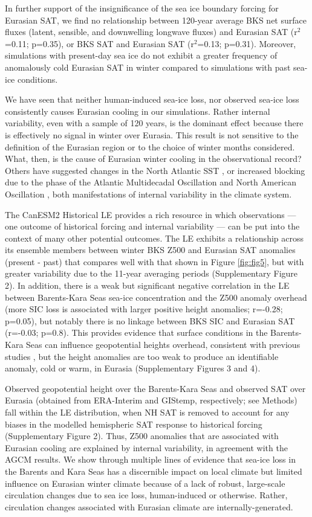 \documentclass{nature}
\begin{document}
In further support of the insignificance of the sea ice boundary forcing for Eurasian SAT, we find no relationship between 120-year average BKS net surface fluxes (latent, sensible, and downwelling longwave fluxes) and Eurasian SAT (r$^2$=0.11; p=0.35), or BKS SAT and Eurasian SAT (r$^2$=0.13; p=0.31). Moreover, simulations with present-day sea ice do not exhibit a greater frequency of anomalously cold Eurasian SAT in winter compared to simulations with past sea-ice conditions.

We have seen that neither human-induced sea-ice loss, nor observed sea-ice loss consistently causes Eurasian cooling in our simulations. Rather internal variability, even with a sample of 120 years, is the dominant effect because there is effectively no signal in winter over Eurasia. This result is not sensitive to the definition of the Eurasian region or to the choice of winter months considered. What, then, is the cause of Eurasian winter cooling in the observational record? Others have suggested changes in the North Atlantic SST \cite{sato14}, or increased blocking due to the phase of the Atlantic Multidecadal Oscillation and North American Oscillation \cite{peings14b}, both manifestations of internal variability in the climate system. 

The CanESM2 Historical LE provides a rich resource in which observations --- one outcome of historical forcing and internal variability --- can be put into the context of many other potential outcomes. The LE exhibits a relationship across its ensemble members between winter BKS Z500 and Eurasian SAT anomalies (present - past) that compares well with that shown in Figure \ref{fig:fig5}, but with greater variability due to the 11-year averaging periods (Supplementary Figure 2). In addition, there is a weak but significant negative correlation in the LE between Barents-Kara Seas sea-ice concentration and the Z500 anomaly overhead (more SIC loss is associated with larger positive height anomalies; r=-0.28; p=0.05), but notably there is no linkage between BKS SIC and Eurasian SAT (r=-0.03; p=0.8). This provides evidence that surface conditions in the Barents-Kara Seas can influence geopotential heights overhead, consistent with previous studies \cite{honda09,mori14}, but the height anomalies are too weak to produce an identifiable anomaly, cold or warm, in Eurasia (Supplementary Figures 3 and 4). 

Observed geopotential height over the Barents-Kara Seas and observed SAT over Eurasia (obtained from ERA-Interim and GIStemp, respectively; see Methods) fall within the LE distribution, when NH SAT is removed to account for any biases in the modelled hemispheric SAT response to historical forcing (Supplementary Figure 2). Thus, Z500 anomalies that are associated with Eurasian cooling are explained by internal variability, in agreement with the AGCM results. We show through multiple lines of evidence that sea-ice loss in the Barents and Kara Seas has a discernible impact on local climate but limited influence on Eurasian winter climate because of a lack of robust, large-scale circulation changes due to sea ice loss, human-induced or otherwise. Rather, circulation changes associated with Eurasian climate are internally-generated.  
\end{document}
